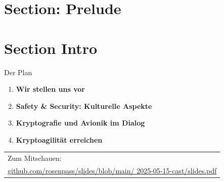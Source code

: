 \section{Section: Prelude}

\section{Section Intro}

\begin{frame}[c]{Der Plan}
  \small

  \begin{enumerate}
    \item \textbf{Wir stellen uns vor}
    \item \textbf{Safety \& Security: Kulturelle Aspekte}
    \item \textbf{Kryptografie und Avionik im Dialog}
    \item \textbf{Kryptoagilität erreichen}
  \end{enumerate}

	\vfill

    {
      \begin{tabular}[c]{@{\space}l}
      Zum Mitschauen:\\
      \footnotesize\href{github.com/rosenpass/slides/blob/main/2025-05-15-cast/slides.pdf}{github.com/rosenpass/slides/blob/main/ 2025-05-15-cast/slides.pdf}
      \end{tabular}
    }
  \vfill
\end{frame}



